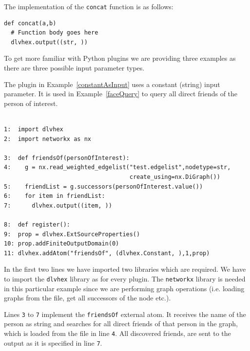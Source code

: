 \documentclass[a4paper, titlepage]{article}
\begin{document}
The implementation of the \verb+concat+ function is as follows:
\begin{verbatim}
def concat(a,b)
  # Function body goes here
  dlvhex.output((str, ))
\end{verbatim} 
To get more familiar with Python plugins we are providing three examples as there are three possible input parameter types.

The plugin in Example~\ref{constantAsInput} uses a constant (string) input parameter. It is used in Example~\ref{faceQuery} to query all direct friends of the person of interest.
\begin{exmp}
\label{constantAsInput}
\begin{verbatim}

1:  import dlvhex
2:  import networkx as nx

3:  def friendsOf(personOfInterest):
4:    g = nx.read_weighted_edgelist("test.edgelist",nodetype=str,
                                    create_using=nx.DiGraph())
5:    friendList = g.successors(personOfInterest.value())
6:    for item in friendList:
7:      dlvhex.output((item, ))

8:  def register():
9:  prop = dlvhex.ExtSourceProperties()
10: prop.addFiniteOutputDomain(0)
11: dlvhex.addAtom("friendsOf", (dlvhex.Constant, ),1,prop)
\end{verbatim}
\end{exmp}

In the first two lines we have imported two libraries which 
are required. We have to import the \verb+dlvhex+ 
library as for every plugin. The \verb+networkx+ library is needed in this particular example since we are 
performing graph operations (i.e. loading graphs from the file, get all successors of the node etc.). 

Lines \verb+3+ to \verb+7+ implement the \verb+friendsOf+ external atom. 
It receives the name of the person as string and searches for all 
direct friends of that person in the graph, which is loaded from the file in line \verb+4+. All discovered friends, are sent to the output as it is specified in line \verb+7+. 
\end{document}
